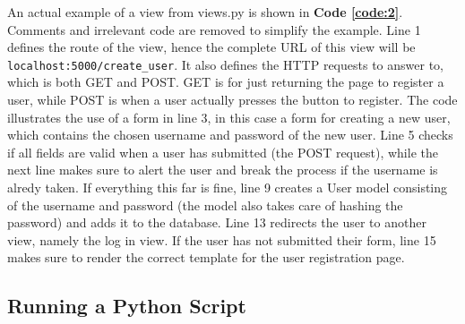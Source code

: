 \noindent An actual example of a view from views.py is shown in \textbf{Code \ref{code:2}}. Comments and irrelevant code are removed to simplify the example. Line 1 defines the route of the view, hence the complete URL of this view will be \texttt{localhost:5000/create\_user}. It also defines the HTTP requests to answer to, which is both GET and POST. GET is for just returning the page to register a user, while POST is when a user actually presses the button to register. The code illustrates the use of a form in line 3, in this case a form for creating a new user, which contains the chosen username and password of the new user. Line 5 checks if all fields are valid when a user has submitted (the POST request), while the next line makes sure to alert the user and break the process if the username is alredy taken. If everything this far is fine, line 9 creates a User model consisting of the username and password (the model also takes care of hashing the password) and adds it to the database. Line 13 redirects the user to another view, namely the log in view. If the user has not submitted their form, line 15 makes sure to render the correct template for the user registration page. \\


\subsection{Running a Python Script}

